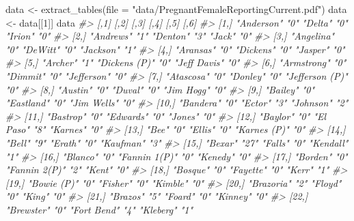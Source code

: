 \documentclass[
]{krantz}
\makeatletter
\newenvironment{Shaded}{\begin{snugshade}}{\end{snugshade}}
\newcommand{\AttributeTok}[1]{\textcolor[rgb]{0.61,0.61,0.61}{#1}}
\newcommand{\CommentTok}[1]{\textcolor[rgb]{0.37,0.37,0.37}{\textit{#1}}}
\newcommand{\DecValTok}[1]{\textcolor[rgb]{0.06,0.06,0.06}{#1}}
\newcommand{\FunctionTok}[1]{\textcolor[rgb]{0,0,0}{#1}}
\newcommand{\NormalTok}[1]{#1}
\newcommand{\OtherTok}[1]{\textcolor[rgb]{0.37,0.37,0.37}{#1}}
\newcommand{\StringTok}[1]{\textcolor[rgb]{0.5,0.5,0.5}{#1}}
\newenvironment{kframe}{%
\medskip{}
\setlength{\fboxsep}{.8em}
 \def\at@end@of@kframe{}%
 \ifinner\ifhmode%
  \def\at@end@of@kframe{\end{minipage}}%
  \begin{minipage}{\columnwidth}%
 \fi\fi%
 \def\FrameCommand##1{\hskip\@totalleftmargin \hskip-\fboxsep
 \colorbox{shadecolor}{##1}\hskip-\fboxsep
     \hskip-\linewidth \hskip-\@totalleftmargin \hskip\columnwidth}%
 \MakeFramed {\advance\hsize-\width
   \@totalleftmargin\z@ \linewidth\hsize
   \@setminipage}}%
 {\par\unskip\endMakeFramed%
 \at@end@of@kframe}
\renewenvironment{Shaded}{\begin{kframe}}{\end{kframe}}
\makeatother
\begin{document}
\begin{Shaded}
\begin{Highlighting}[]
\NormalTok{data }\OtherTok{\textless{}{-}} \FunctionTok{extract\_tables}\NormalTok{(}\AttributeTok{file =} \StringTok{"data/PregnantFemaleReportingCurrent.pdf"}\NormalTok{)}
\NormalTok{data }\OtherTok{\textless{}{-}}\NormalTok{ data[[}\DecValTok{1}\NormalTok{]]}
\NormalTok{data}
\CommentTok{\#\textgreater{}       [,1]            [,2] [,3]          [,4] [,5]            [,6]}
\CommentTok{\#\textgreater{}  [1,] "Anderson"      "0"  "Delta"       "0"  "Irion"         "0" }
\CommentTok{\#\textgreater{}  [2,] "Andrews"       "1"  "Denton"      "3"  "Jack"          "0" }
\CommentTok{\#\textgreater{}  [3,] "Angelina"      "0"  "DeWitt"      "0"  "Jackson"       "1" }
\CommentTok{\#\textgreater{}  [4,] "Aransas"       "0"  "Dickens"     "0"  "Jasper"        "0" }
\CommentTok{\#\textgreater{}  [5,] "Archer"        "1"  "Dickens (P)" "0"  "Jeff Davis"    "0" }
\CommentTok{\#\textgreater{}  [6,] "Armstrong"     "0"  "Dimmit"      "0"  "Jefferson"     "0" }
\CommentTok{\#\textgreater{}  [7,] "Atascosa"      "0"  "Donley"      "0"  "Jefferson (P)" "0" }
\CommentTok{\#\textgreater{}  [8,] "Austin"        "0"  "Duval"       "0"  "Jim Hogg"      "0" }
\CommentTok{\#\textgreater{}  [9,] "Bailey"        "0"  "Eastland"    "0"  "Jim Wells"     "0" }
\CommentTok{\#\textgreater{} [10,] "Bandera"       "0"  "Ector"       "3"  "Johnson"       "2" }
\CommentTok{\#\textgreater{} [11,] "Bastrop"       "0"  "Edwards"     "0"  "Jones"         "0" }
\CommentTok{\#\textgreater{} [12,] "Baylor"        "0"  "El Paso"     "8"  "Karnes"        "0" }
\CommentTok{\#\textgreater{} [13,] "Bee"           "0"  "Ellis"       "0"  "Karnes (P)"    "0" }
\CommentTok{\#\textgreater{} [14,] "Bell"          "9"  "Erath"       "0"  "Kaufman"       "3" }
\CommentTok{\#\textgreater{} [15,] "Bexar"         "27" "Falls"       "0"  "Kendall"       "1" }
\CommentTok{\#\textgreater{} [16,] "Blanco"        "0"  "Fannin 1(P)" "0"  "Kenedy"        "0" }
\CommentTok{\#\textgreater{} [17,] "Borden"        "0"  "Fannin 2(P)" "2"  "Kent"          "0" }
\CommentTok{\#\textgreater{} [18,] "Bosque"        "0"  "Fayette"     "0"  "Kerr"          "1" }
\CommentTok{\#\textgreater{} [19,] "Bowie (P)"     "0"  "Fisher"      "0"  "Kimble"        "0" }
\CommentTok{\#\textgreater{} [20,] "Brazoria"      "2"  "Floyd"       "0"  "King"          "0" }
\CommentTok{\#\textgreater{} [21,] "Brazos"        "5"  "Foard"       "0"  "Kinney"        "0" }
\CommentTok{\#\textgreater{} [22,] "Brewster"      "0"  "Fort Bend"   "4"  "Kleberg"       "1" }

\end{Highlighting}
\end{Shaded}
\end{document}
